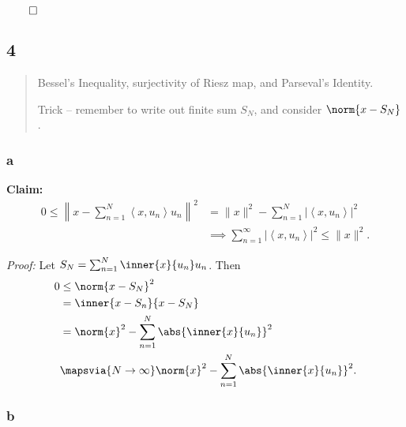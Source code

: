 \(\qed\)

\hypertarget{section-3}{%
\subsection{4}\label{section-3}}

\begin{quote}
Bessel's Inequality, surjectivity of Riesz map, and Parseval's Identity.

Trick -- remember to write out finite sum \(S_N\), and consider
\(\norm{x - S_N}\).
\end{quote}

\hypertarget{a-2}{%
\subsubsection{a}\label{a-2}}

\textbf{Claim:} \begin{align*}
0 \leq \left\|x-\sum_{n=1}^{N}\left\langle x, u_{n}\right\rangle u_{n}\right\|^{2}
&= \|x\|^{2}-\sum_{n=1}^{N}\left|\left\langle x, u_{n}\right\rangle\right|^{2} \\ 
&\implies
\sum_{n=1}^{\infty}\left|\left\langle x, u_{n}\right\rangle\right|^{2} \leq\|x\|^{2}
.\end{align*}

\emph{Proof:} Let \(S_N = \sum_{n=1}^N \inner{x}{u_n} u_n\). Then
\begin{align*}
0 
&\leq \norm{x - S_N}^2 \\ 
&= \inner{x - S_n}{x - S_N} \\
&= \norm{x}^2 - \sum_{n=1}^N \abs{\inner{x}{u_n}}^2 \\
&\mapsvia{N\to\infty} \norm{x}^2 - \sum_{n=1}^N \abs{\inner{x}{u_n}}^2
.\end{align*}

\hypertarget{b-2}{%
\subsubsection{b}\label{b-2}}

